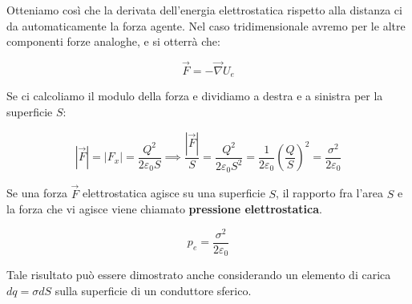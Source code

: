 Otteniamo così che la derivata dell'energia elettrostatica rispetto alla distanza ci da automaticamente la forza agente. Nel caso tridimensionale avremo per le altre componenti forze analoghe, e si otterrà che:

\[
	\boxed{\vec{F} = - \vec{\nabla} U_e}
\]

Se ci calcoliamo il modulo della forza e dividiamo a destra e a sinistra per la superficie $S$:

\[
	|\vec{F}| = |F_x| = \frac{Q^2}{2\varepsilon_0 S} \implies \frac{|\vec{F}|}{S} = \frac{Q^2}{2\varepsilon_0 S^2} = \frac{1}{2\varepsilon_0} \left( \frac{Q}{S} \right)^2 = \frac{\sigma^2}{2\varepsilon_0}
\]

Se una forza $\vec{F}$ elettrostatica agisce su una superficie $S$, il rapporto fra l'area $S$ e la forza che vi agisce viene chiamato \textbf{pressione elettrostatica}.

\[
	\boxed{p_e = \frac{\sigma^2}{2\varepsilon_0}}
\]

Tale risultato può essere dimostrato anche considerando un elemento di carica $dq=\sigma dS$ sulla superficie di un conduttore sferico.

